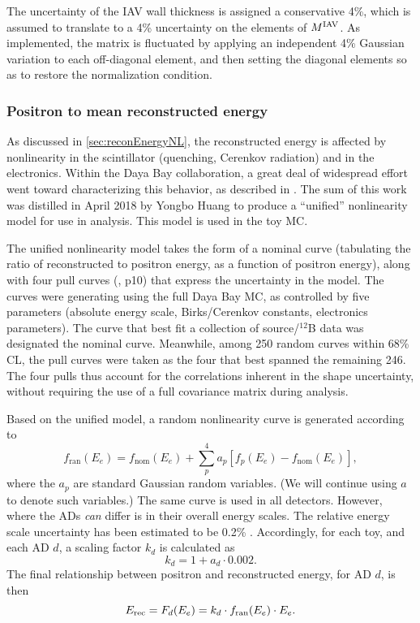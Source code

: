 \documentclass[../thesis.tex]{subfiles}
\begin{document}
The uncertainty of the IAV wall thickness is assigned a conservative 4\%, which is assumed to translate to a 4\% uncertainty on the elements of $M^{\mathrm{IAV}}$. As implemented, the matrix is fluctuated by applying an independent 4\% Gaussian variation to each off-diagonal element, and then setting the diagonal elements so as to restore the normalization condition.

\subsubsection{Positron to mean reconstructed energy}

As discussed in \autoref{sec:reconEnergyNL}, the reconstructed energy is affected by nonlinearity in the scintillator (quenching, Cerenkov radiation) and in the electronics. Within the Daya Bay collaboration, a great deal of widespread effort went toward characterizing this behavior, as described in \cite{NonlinearityPaper}. The sum of this work was distilled in April 2018 by Yongbo Huang \cite{EnergyModelUpdateYongbo} to produce a ``unified'' nonlinearity model for use in analysis. This model is used in the toy MC.

The unified nonlinearity model takes the form of a nominal curve (tabulating the ratio of reconstructed to positron energy, as a function of positron energy), along with four pull curves (\cite{EnergyModelUpdateSoeren}, p10) that express the uncertainty in the model. The curves were generating using the full Daya Bay MC, as controlled by five parameters (absolute energy scale, Birks/Cerenkov constants, electronics parameters). The curve that best fit a collection of source/$^{12}$B data was designated the nominal curve. Meanwhile, among 250 random curves within 68\% CL, the pull curves were taken as the four that best spanned the remaining 246. The four pulls thus account for the correlations inherent in the shape uncertainty, without requiring the use of a full covariance matrix during analysis.

Based on the unified model, a random nonlinearity curve is generated according to
\begin{equation}
  \label{eq:fitRandomNL}
  f_{\mathrm{ran}}(E_e) = f_{\mathrm{nom}}(E_e) + \sum_p^4 a_p [ f_p(E_e) - f_{\mathrm{nom}}(E_e)],
\end{equation}
where the $a_p$ are standard Gaussian random variables. (We will continue using $a$ to denote such variables.) The same curve is used in all detectors. However, where the ADs \textit{can} differ is in their overall energy scales. The relative energy scale uncertainty has been estimated to be 0.2\% \cite{berkeley_shapefit_P14A}. Accordingly, for each toy, and each AD $d$, a scaling factor $k_d$ is calculated as
\begin{equation*}
  k_d = 1 + a_d \cdot 0.002.
\end{equation*}
The final relationship between positron and reconstructed energy, for AD $d$, is then
\begin{equation*}
  E_\mathrm{rec} = F_d(E_e) = k_d \cdot f_{\mathrm{ran}}(E_e) \cdot E_e.
\end{equation*}
\end{document}
